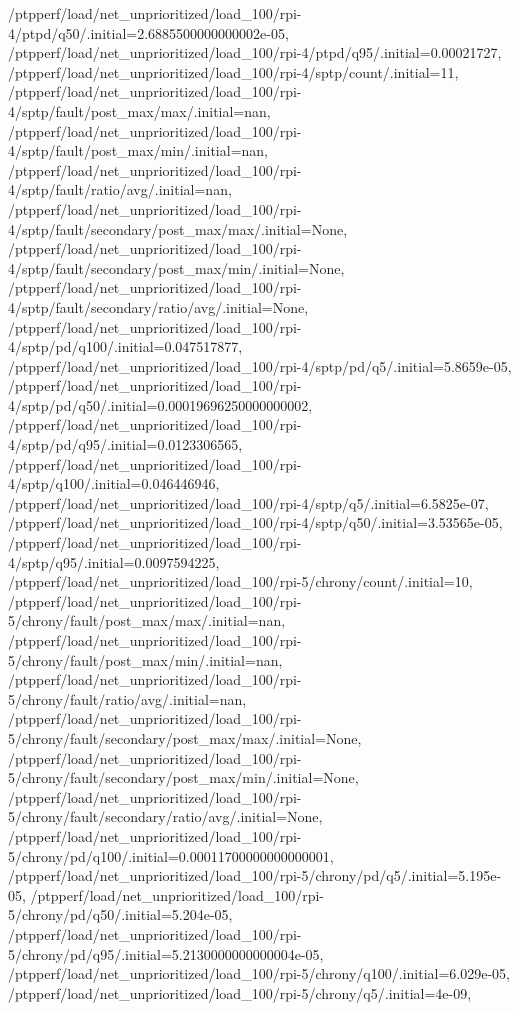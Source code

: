 {    /ptpperf/load/net_unprioritized/load_100/rpi-4/ptpd/q50/.initial=2.6885500000000002e-05,
    /ptpperf/load/net_unprioritized/load_100/rpi-4/ptpd/q95/.initial=0.00021727,
    /ptpperf/load/net_unprioritized/load_100/rpi-4/sptp/count/.initial=11,
    /ptpperf/load/net_unprioritized/load_100/rpi-4/sptp/fault/post_max/max/.initial=nan,
    /ptpperf/load/net_unprioritized/load_100/rpi-4/sptp/fault/post_max/min/.initial=nan,
    /ptpperf/load/net_unprioritized/load_100/rpi-4/sptp/fault/ratio/avg/.initial=nan,
    /ptpperf/load/net_unprioritized/load_100/rpi-4/sptp/fault/secondary/post_max/max/.initial=None,
    /ptpperf/load/net_unprioritized/load_100/rpi-4/sptp/fault/secondary/post_max/min/.initial=None,
    /ptpperf/load/net_unprioritized/load_100/rpi-4/sptp/fault/secondary/ratio/avg/.initial=None,
    /ptpperf/load/net_unprioritized/load_100/rpi-4/sptp/pd/q100/.initial=0.047517877,
    /ptpperf/load/net_unprioritized/load_100/rpi-4/sptp/pd/q5/.initial=5.8659e-05,
    /ptpperf/load/net_unprioritized/load_100/rpi-4/sptp/pd/q50/.initial=0.00019696250000000002,
    /ptpperf/load/net_unprioritized/load_100/rpi-4/sptp/pd/q95/.initial=0.0123306565,
    /ptpperf/load/net_unprioritized/load_100/rpi-4/sptp/q100/.initial=0.046446946,
    /ptpperf/load/net_unprioritized/load_100/rpi-4/sptp/q5/.initial=6.5825e-07,
    /ptpperf/load/net_unprioritized/load_100/rpi-4/sptp/q50/.initial=3.53565e-05,
    /ptpperf/load/net_unprioritized/load_100/rpi-4/sptp/q95/.initial=0.0097594225,
    /ptpperf/load/net_unprioritized/load_100/rpi-5/chrony/count/.initial=10,
    /ptpperf/load/net_unprioritized/load_100/rpi-5/chrony/fault/post_max/max/.initial=nan,
    /ptpperf/load/net_unprioritized/load_100/rpi-5/chrony/fault/post_max/min/.initial=nan,
    /ptpperf/load/net_unprioritized/load_100/rpi-5/chrony/fault/ratio/avg/.initial=nan,
    /ptpperf/load/net_unprioritized/load_100/rpi-5/chrony/fault/secondary/post_max/max/.initial=None,
    /ptpperf/load/net_unprioritized/load_100/rpi-5/chrony/fault/secondary/post_max/min/.initial=None,
    /ptpperf/load/net_unprioritized/load_100/rpi-5/chrony/fault/secondary/ratio/avg/.initial=None,
    /ptpperf/load/net_unprioritized/load_100/rpi-5/chrony/pd/q100/.initial=0.00011700000000000001,
    /ptpperf/load/net_unprioritized/load_100/rpi-5/chrony/pd/q5/.initial=5.195e-05,
    /ptpperf/load/net_unprioritized/load_100/rpi-5/chrony/pd/q50/.initial=5.204e-05,
    /ptpperf/load/net_unprioritized/load_100/rpi-5/chrony/pd/q95/.initial=5.2130000000000004e-05,
    /ptpperf/load/net_unprioritized/load_100/rpi-5/chrony/q100/.initial=6.029e-05,
    /ptpperf/load/net_unprioritized/load_100/rpi-5/chrony/q5/.initial=4e-09,
}
